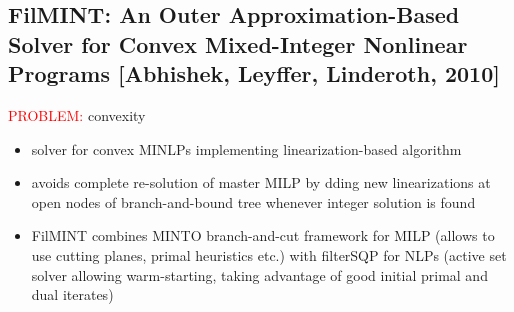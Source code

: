 \documentclass{article}
\begin{document}
\subsection{FilMINT: An Outer Approximation-Based Solver for Convex Mixed-Integer Nonlinear Programs [Abhishek, Leyffer, Linderoth, 2010]}
\textcolor{red}{PROBLEM:} convexity
\begin{itemize}
\item solver for convex MINLPs implementing linearization-based algorithm
\item avoids complete re-solution of master MILP by dding new linearizations at open nodes of branch-and-bound tree whenever integer solution is found
\item FilMINT combines MINTO branch-and-cut framework for MILP (allows to use cutting planes, primal heuristics etc.)  with filterSQP for NLPs (active set solver allowing warm-starting, taking advantage of good initial primal and dual iterates)
\end{itemize}





\newpage
\end{document}

